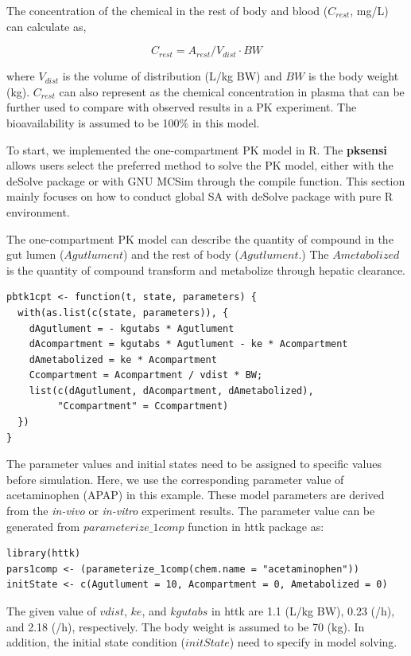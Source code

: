 \documentclass[preprint,12pt, a4paper]{elsarticle}
\begin{document}
The concentration of the chemical in the rest of body and blood
(\(C_{rest}\), mg/L) can calculate as,

\[ C_{rest} = A_{rest} / V_{dist} \cdot BW\]

where \(V_{dist}\) is the volume of distribution (L/kg BW) and \(BW\) is
the body weight (kg). \(C_{rest}\) can also represent as the chemical
concentration in plasma that can be further used to compare with
observed results in a PK experiment. The bioavailability is assumed to
be 100\% in this model.

To start, we implemented the one-compartment PK model in R. The
\textbf{pksensi} allows users select the preferred method to solve the
PK model, either with the deSolve package or with GNU MCSim
through the compile function. This section mainly focuses on how to
conduct global SA with deSolve package with pure R
environment.


The one-compartment PK model can describe the quantity of compound in
the gut lumen (\(Agutlument\)) and the rest of body
(\(Agutlument\).) The \(Ametabolized\) is the quantity of
compound transform and metabolize through hepatic clearance.

\begin{lstlisting}
pbtk1cpt <- function(t, state, parameters) {
  with(as.list(c(state, parameters)), {
    dAgutlument = - kgutabs * Agutlument
    dAcompartment = kgutabs * Agutlument - ke * Acompartment
    dAmetabolized = ke * Acompartment
    Ccompartment = Acompartment / vdist * BW;
    list(c(dAgutlument, dAcompartment, dAmetabolized), 
         "Ccompartment" = Ccompartment) 
  })
}
\end{lstlisting}

The parameter values and initial states need to be assigned to specific
values before simulation. Here, we use the corresponding parameter value
of acetaminophen (APAP) in this example. These model parameters are
derived from the \emph{in-vivo} or \emph{in-vitro} experiment results.
The parameter value can be generated from \(parameterize\_1comp\)
function in httk package as:

\begin{lstlisting}
library(httk)
pars1comp <- (parameterize_1comp(chem.name = "acetaminophen"))
initState <- c(Agutlument = 10, Acompartment = 0, Ametabolized = 0)
\end{lstlisting}

The given value of \(vdist\), \(ke\), and \(kgutabs\) in httk are 1.1 (L/kg BW), 0.23 (/h), and 2.18 (/h),
respectively. The body weight is assumed to be 70 (kg). 
In addition, the initial state condition (\(initState\)) need to specify in model solving.
\end{document}
